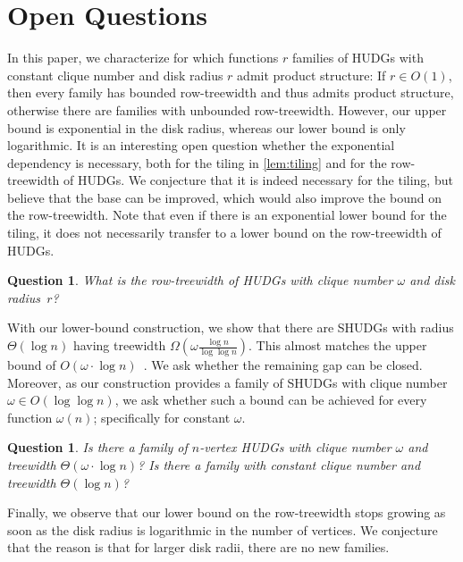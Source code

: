 \documentclass[a4paper,english,cleveref,thm-restate]{lipics-v2021}
\newtheorem{question}[theorem]{Question}
\begin{document}


\section{Open Questions}\label{sec:open}

In this paper, we characterize for which functions $ r $ families of HUDGs with constant clique number and disk radius $ r $ admit product structure:
If $ r \in O(1) $, then every family has bounded row-treewidth and thus admits product structure, otherwise there are families with unbounded row-treewidth.
However, our upper bound is exponential in the disk radius, whereas our lower bound is only logarithmic. 
It is an interesting open question whether the exponential dependency is necessary, both for the tiling in \cref{lem:tiling} and for the row-treewidth of HUDGs.
We conjecture that it is indeed necessary for the tiling, but believe that the base can be improved, which would also improve the bound on the row-treewidth.
Note that even if there is an exponential lower bound for the tiling, it does not necessarily transfer to a lower bound on the row-treewidth of HUDGs.

\begin{question}
    What is the row-treewidth of HUDGs with clique number $ \omega $ and disk radius~$ r $?
\end{question}

With our lower-bound construction, we show that there are SHUDGs with radius $ \Theta(\log n) $ having treewidth $ \Omega( \omega \frac{\log n}{\log \log n} ) $.
This almost matches the upper bound of $ O(\omega \cdot \log n) $~\cite{Struc_Indep_Hyper_Unifor_Disk_Graph-Blaesius25,Treew_Graph_Balan_Separ-DvoraNorin19}.
We ask whether the remaining gap can be closed.
Moreover, as our construction provides a family of SHUDGs with clique number $\omega \in O(\log \log n)$, we ask whether such a bound can be achieved for every function $\omega(n)$; specifically for constant $\omega$.

\begin{question}
    Is there a family of $ n $-vertex HUDGs with clique number $ \omega $ and treewidth $ \Theta(\omega \cdot \log n) $?
    Is there a family with constant clique number and treewidth $\Theta(\log n)$?
\end{question}

Finally, we observe that our lower bound on the row-treewidth stops growing as soon as the disk radius is logarithmic in the number of vertices.
We conjecture that the reason is that for larger disk radii, there are no new families.
\end{document}
